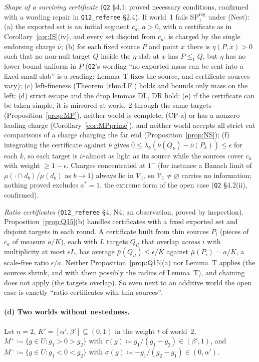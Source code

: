 \documentclass[11pt]{article}
\theoremstyle{definition}
\theoremstyle{remark}
\newcommand{\src}[1]{\texttt{#1}}
\begin{document}
\emph{Shape of a surviving certificate} (\src{Q2} \S4.1; proved necessary conditions, confirmed with a wording repair in \src{Q12\_referee} \S2.4). If world~1 fails SP$^{\mathrm{reg}}_1$ under (Nest): (a) the exported set is an initial segment $c_a$, $a>0$, with a certificate as in Corollary~\ref{cor:IS}(iv), and every set disjoint from $c_{a^*}$ is charged by the single endorsing charge $\bar\nu$; (b) for each fixed source $P$ and point $x$ there is $\eta(P,x)>0$ such that no non-null target $Q$ inside the $\eta$-slab at $x$ has $P\le_1Q$, but $\eta$ has no lower bound uniform in $P$ (\src{Q2}'s wording ``no exported mass can be sent into a fixed small slab'' is a reading: Lemma~T fixes the source, and certificate sources vary); (c) left-fineness (Theorem~\ref{thm:LF}) holds and bounds only mass on the left; (d) strict escape and the drop lemmas DL, DR hold; (e) if the certificate can be taken simple, it is mirrored at world~2 through the same targets (Proposition~\ref{prop:MP}), neither world is complete, (CP-a) or has a nonzero leading charge (Corollary~\ref{cor:MPprime}), and neither world accepts all strict cut comparisons of a charge charging the far end (Proposition~\ref{prop:NS}); (f) integrating the certificate against $\bar\nu$ gives $0\le\lambda_k(\bar\nu(Q_k)-\bar\nu(P_k))\le\epsilon$ for each $k$, so each target is $\bar\nu$-almost as light as its source while the sources cover $c_a$ with weight $\ge1-\epsilon$. Charges concentrated at $1^-$ (for instance a Banach limit of $\mu(\cdot\cap d_b)/\mu(d_b)$ as $b\to1$) always lie in $\mathcal V_1$, so $\mathcal V_1\ne\varnothing$ carries no information; nothing proved excludes $a^*=1$, the extreme form of the open case (\src{Q2} \S4.2(ii), confirmed).

\emph{Ratio certificates} (\src{Q12\_referee} \S4, N4; an observation, proved by inspection). Proposition~\ref{prop:Q15}(b) handles certificates with a fixed exported set and disjoint targets in each round. A certificate built from thin sources $P_i$ (pieces of $c_a$ of measure $a/K$), each with $L$ targets $Q_{il}$ that overlap \emph{across} $i$ with multiplicity at most $\epsilon L$, has average $\bar\mu(Q_{il})\le\epsilon/K$ against $\bar\mu(P_i)=a/K$, a scale-free ratio $\epsilon/a$. Neither Proposition~\ref{prop:Q15}(a) nor Lemma~T applies (the sources shrink, and with them possibly the radius of Lemma~T), and chaining does not apply (the targets overlap). So even next to an additive world the open case is exactly ``ratio certificates with thin sources''.

\paragraph{(d) Two worlds without nestedness.} Let $n=2$, $K'=[\alpha',\beta']\subseteq(0,1)$ in the weight $t$ of world~2, $M^+\coloneqq\{g\in U:g_1>0>g_2\}$ with $\tau(g)\coloneqq g_1/(g_1-g_2)\in(\beta',1)$, and $M^-\coloneqq\{g\in U:g_1<0<g_2\}$ with $\sigma(g)\coloneqq-g_1/(g_2-g_1)\in(0,\alpha')$.
\end{document}
